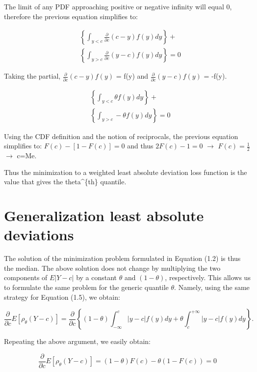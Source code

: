 \documentclass[
  letterpaper,
  DIV=11,
  numbers=noendperiod]{scrreprt}
\begin{document}
The limit of any PDF approaching positive or negative infinity will
equal 0, therefore the previous equation simplifies to:

\[
\begin{aligned}
& \left\{\int_{y<c} \frac{\partial}{\partial c}(c-y) f(y) d y\right\}+ \\
& \left\{\int_{y>c} \frac{\partial}{\partial c}(y-c) f(y) d y\right\}=0
\end{aligned}
\]

Taking the partial, \(\frac{\partial}{\partial c}(c-y)f(y)\) = f(y) and
\(\frac{\partial}{\partial c}(y-c)f(y)\) = -f(y).

\[
\begin{aligned}
& \left\{\int_{y<c} \theta f(y) d y\right\}+ \\
& \left\{\int_{y>c} -\theta f(y) d y\right\}=0
\end{aligned}
\]

Using the CDF definition and the notion of reciprocals, the previous
equation simplifies to: \(F(c)-[1-F(c)] = 0\) and thus \(2F(c)-1=0\)
\(\longrightarrow\) \(F(c)=\frac{1}{2}\) \(\longrightarrow\) c=Me.

Thus the minimization to a weighted least absolute deviation loss
function is the value that gives the theta\^{}\{th\} quantile.


\hypertarget{generalization-least-absolute-deviations}{%
\chapter{Generalization least absolute
deviations}\label{generalization-least-absolute-deviations}}

The solution of the minimization problem formulated in Equation (1.2) is
thus the median. The above solution does not change by multiplying the
two components of \(E|Y-c|\) by a constant \(\theta\) and
\((1-\theta)\), respectively. This allows us to formulate the same
problem for the generic quantile \(\theta\). Namely, using the same
strategy for Equation (1.5), we obtain:

\[
\frac{\partial}{\partial c} E\left[\rho_\theta(Y-c)\right]=\frac{\partial}{\partial c}\left\{(1-\theta) \int_{-\infty}^c|y-c| f(y) d y+\theta \int_c^{+\infty}|y-c| f(y) d y\right\} .
\]

Repeating the above argument, we easily obtain:

\[
\frac{\partial}{\partial c} E\left[\rho_\theta(Y-c)\right]=(1-\theta) F(c)-\theta(1-F(c))=0
\]
\end{document}
